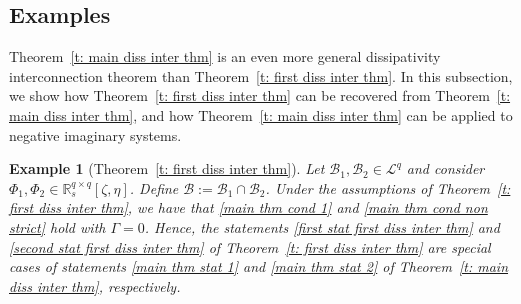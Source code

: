\documentclass[letterpaper, 10 pt, conference]{ieeeconf}
\theoremstyle{ieeeconf}
\newtheorem{example}{Example}
\newcommand{\R}{\mathbb{R}}
\newcommand{\B}{\mathcal{B}}
\begin{document}
\subsection{Examples}Theorem~\ref{t: main diss inter thm} is an even more general dissipativity interconnection theorem than Theorem~\ref{t: first diss inter thm}. In this subsection, we show how Theorem~\ref{t: first diss inter thm} can be recovered from Theorem~\ref{t: main diss inter thm}, and how Theorem~\ref{t: main diss inter thm} can be applied to negative imaginary systems. 
\begin{example}[Theorem~\ref{t: first diss inter thm}]
	Let $\B_1,\B_2 \in \mathcal{L}^q$ and consider $\Phi_1, \Phi_2 \in \R_s^{q \times q}[\zeta,\eta]$. Define $\B := \B_1 \cap \B_2$. Under the assumptions of Theorem~\ref{t: first diss inter thm}, we have that \eqref{main thm cond 1} and \eqref{main thm cond non strict} hold with $\Gamma=0$. Hence, the statements \ref{first stat first diss inter thm} and \ref{second stat first diss inter thm} of Theorem~\ref{t: first diss inter thm} are special cases of statements \ref{main thm stat 1} and \ref{main thm stat 2} of Theorem~\ref{t: main diss inter thm}, respectively.
		\label{ex. prev thm}
\end{example}
\end{document}
